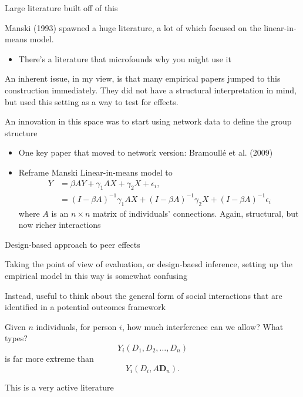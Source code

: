 \documentclass[notes,11pt, aspectratio=169]{beamer}
\newenvironment{wideitemize}{\itemize\addtolength{\itemsep}{10pt}}{\enditemize}
\begin{document}
\begin{frame}{Large literature built off of this}
  \begin{wideitemize}
  \item Manski (1993) spawned a huge literature, a lot of which
    focused on the linear-in-means model.
    \begin{itemize}
    \item There's a literature that microfounds why you might use it
    \end{itemize}
  \item An inherent issue, in my view, is that many empirical papers
    jumped to this construction immediately. They did not have a
    structural interpretation in mind, but used this setting as a way
    to test for effects.
  \item An innovation in this space was to start using network data to define the group structure
    \begin{itemize}
    \item One key paper that moved to network version:  Bramoull\'e et al. (2009)
    \item Reframe Manski Linear-in-means model to
      \begin{align*}
        Y &= \beta AY  + \gamma_{1} AX + \gamma_{2}X + \epsilon_{i},\\
          &=   (I-\beta A)^{-1}\gamma_{1} AX + (I-\beta A)^{-1}\gamma_{2}X + (I-\beta A)^{-1}\epsilon_{i} 
      \end{align*}
      where $A$ is an $n \times n$ matrix of individuals'
      connections. Again, structural, but now richer interactions
    \end{itemize}
  \end{wideitemize}
\end{frame}

\begin{frame}{Design-based approach to peer effects}
  \begin{wideitemize}
  \item Taking the point of view of evaluation, or design-baesd
    inference, setting up the empirical model in this way is somewhat confusing
  \item Instead, useful to think about the general form of social
    interactions that are identified in a potential outcomes framework
  \item Given $n$ individuals, for person $i$, how much interference can we allow? What types?
    \begin{equation*}
      Y_{i}(D_{1}, D_{2}, \ldots, D_{n})
    \end{equation*}
    is far more extreme than
    \begin{equation*}
      Y_{i}(D_{i}, A\mathbf{D}_{n}).
    \end{equation*}
  \item This is a very active literature
  \end{wideitemize}
\end{frame}
\end{document}
